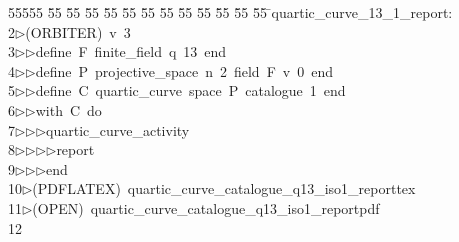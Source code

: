 %
%
\begin{tabbing}
55555 \= 55 \= 55 \= 55 \= 55 \= 55 \= 55 \= 55 \= 55 \= 55 \= 55 \= 55 \= 55 \= \>quartic\_curve\_13\_1\_report:\ \\[0pt]
2\>$\triangleright$\>(ORBITER)\ v\ 3\ \\[0pt]
3\>$\triangleright$\>$\triangleright$\>define\ F\ finite\_field\ q\ 13\ end\ \\[0pt]
4\>$\triangleright$\>$\triangleright$\>define\ P\ projective\_space\ n\ 2\ field\ F\ v\ 0\ end\ \\[0pt]
5\>$\triangleright$\>$\triangleright$\>define\ C\ quartic\_curve\ space\ P\ catalogue\ 1\ end\ \\[0pt]
6\>$\triangleright$\>$\triangleright$\>with\ C\ do\ \\[0pt]
7\>$\triangleright$\>$\triangleright$\>$\triangleright$\>quartic\_curve\_activity\ \\[0pt]
8\>$\triangleright$\>$\triangleright$\>$\triangleright$\>$\triangleright$\>report\ \\[0pt]
9\>$\triangleright$\>$\triangleright$\>$\triangleright$\>end\\[0pt]
10\>$\triangleright$\>(PDFLATEX)\ quartic\_curve\_catalogue\_q13\_iso1\_reporttex\\[0pt]
11\>$\triangleright$\>(OPEN)\ quartic\_curve\_catalogue\_q13\_iso1\_reportpdf\\[0pt]
12\>\end{tabbing}
